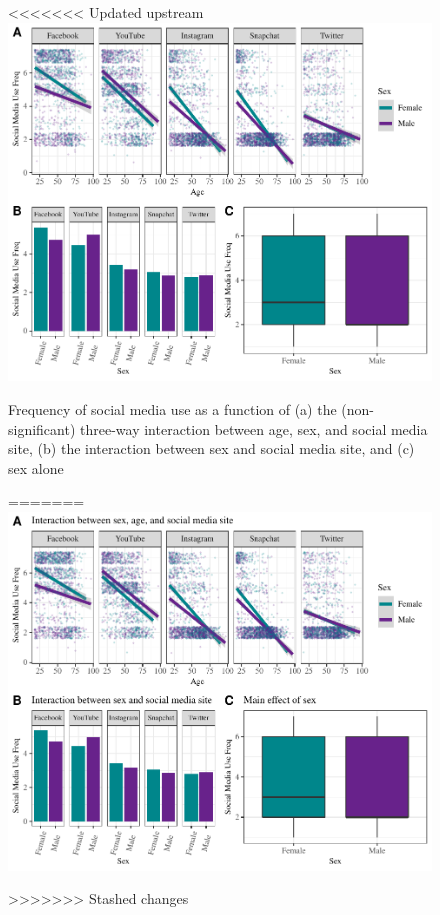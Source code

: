 \documentclass[man, fleqn, noextraspace]{apa6}
\theoremstyle{definition}
\theoremstyle{definition}
\theoremstyle{definition}
\theoremstyle{remark}
\begin{document}
\begin{figure}
\centering
<<<<<<< Updated upstream
\includegraphics{final_manuscript_files/figure-latex/fig2-1.pdf}
\caption{\label{fig:fig2}Frequency of social media use as a function of (a)
the (non-significant) three-way interaction between age, sex, and social
media site, (b) the interaction between sex and social media site, and
(c) sex alone}
=======
\includegraphics{final_manuscript_files/figure-latex/ash_analyses_viz2-1.pdf}
\caption{}
>>>>>>> Stashed changes
\end{figure}
\end{document}
